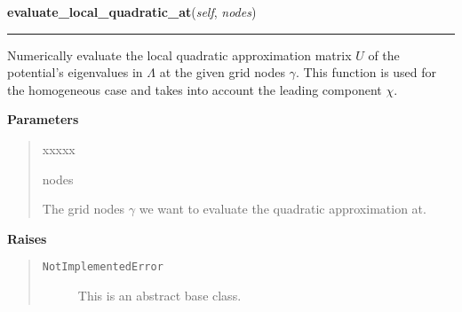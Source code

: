     \vspace{0.5ex}

\hspace{.8\funcindent}\begin{boxedminipage}{\funcwidth}

    \raggedright \textbf{evaluate\_local\_quadratic\_at}(\textit{self}, \textit{nodes})

    \vspace{-1.5ex}

    \rule{\textwidth}{0.5\fboxrule}
\setlength{\parskip}{2ex}
    Numerically evaluate the local quadratic approximation matrix $U$ of
    the potential's eigenvalues in $\Lambda$ at the given
    grid nodes $\gamma$. This function is used for the
    homogeneous case and takes into account the leading component
    $\chi$.

\setlength{\parskip}{1ex}
      \textbf{Parameters}
      \vspace{-1ex}

      \begin{quote}
        \begin{Ventry}{xxxxx}

          \item[nodes]

          The grid nodes $\gamma$ we want to evaluate the
          quadratic approximation at.

        \end{Ventry}

      \end{quote}

      \textbf{Raises}
    \vspace{-1ex}

      \begin{quote}
        \begin{description}

          \item[\texttt{NotImplementedError}]

          This is an abstract base class.

        \end{description}

      \end{quote}

    \end{boxedminipage}

    \label{MatrixPotential:MatrixPotential:calculate_local_remainder}

